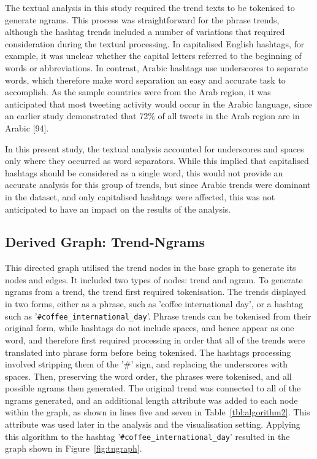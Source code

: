 \documentclass[conference]{IEEEtran}
\begin{document}
The textual analysis in
this study required the trend texts to be tokenised to generate
ngrams. This process was straightforward for the phrase trends,
although the hashtag trends included a number of variations that
required consideration during the textual processing. In capitalised
English hashtags, for example, it was unclear whether the capital
letters referred to the beginning of words or abbreviations. In
contrast, Arabic hashtags use underscores to separate words, which
therefore make word separation an easy and accurate task to
accomplish. As the sample countries were from the Arab region, it was
anticipated that most tweeting activity would occur in the Arabic
language, since an earlier study demonstrated that 72\% of all tweets
in the Arab region are in Arabic [94].

In this present study, the textual analysis accounted for underscores
and spaces only where they occurred as word separators. While this
implied that capitalised hashtags should be considered as a single
word, this would not provide an accurate analysis for this group of
trends, but since Arabic trends were dominant in the dataset, and only
capitalised hashtags were affected, this was not anticipated to have
an impact on the results of the analysis.


\subsection{Derived Graph: Trend-Ngrams}

This directed graph utilised the trend nodes in the base graph to
generate its nodes and edges. It included two types of nodes: trend
and ngram. To generate ngrams from a trend, the trend first required
tokenisation. The trends displayed in two forms, either as a phrase,
such as 'coffee international day', or a hashtag such as
'{\texttt{\#coffee\_international\_day}}'.  Phrase trends can be
tokenised from their original form, while hashtags do not include
spaces, and hence appear as one word, and therefore first required
processing in order that all of the trends were translated into phrase
form before being tokenised. The hashtags processing involved
stripping them of the '\#' sign, and replacing the underscores with
spaces. Then, preserving the word order, the phrases were tokenised,
and all possible ngrams then generated.  The original trend was
connected to all of the ngrams generated, and an additional length
attribute was added to each node within the graph, as shown in lines
five and seven in Table~\ref{tbl:algorithm2}. 
This attribute was used later in the
analysis and the visualisation setting. Applying this algorithm to the
hashtag '{\texttt{\#coffee\_international\_day}}' resulted in the
graph shown in Figure~\ref{fig:tngraph}.
\end{document}
